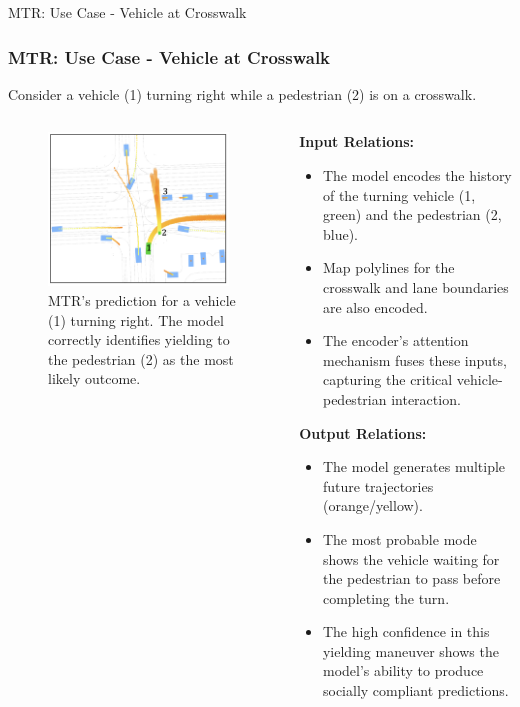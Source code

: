 \documentclass[10pt,aspectratio=169]{beamer}
\begin{document}
\begin{frame}{MTR: Use Case - Vehicle at Crosswalk}
    \frametitle{MTR: Use Case - Vehicle at Crosswalk}
    Consider a vehicle (1) turning right while a pedestrian (2) is on a crosswalk.
    \begin{columns}[T]
        \begin{column}{0.4\textwidth}
            \begin{figure}
                \centering
                \includegraphics[width=0.95\textwidth]{docs/latex/figures/input_output_viz_crosswalk_detail.png}
                \caption{MTR's prediction for a vehicle (1) turning right. The model correctly identifies yielding to the pedestrian (2) as the most likely outcome.}
            \end{figure}
        \end{column}
        \begin{column}{0.6\textwidth}
            \textbf{Input Relations:}
            \begin{itemize}
                \item The model encodes the history of the turning vehicle (1, green) and the pedestrian (2, blue).
                \item Map polylines for the crosswalk and lane boundaries are also encoded.
                \item The encoder's attention mechanism fuses these inputs, capturing the critical vehicle-pedestrian interaction.
            \end{itemize}
            \textbf{Output Relations:}
            \begin{itemize}
                \item The model generates multiple future trajectories (orange/yellow).
                \item The most probable mode shows the vehicle waiting for the pedestrian to pass before completing the turn.
                \item The high confidence in this yielding maneuver shows the model's ability to produce socially compliant predictions.
            \end{itemize}
        \end{column}
    \end{columns}
\end{frame}
\end{document}
